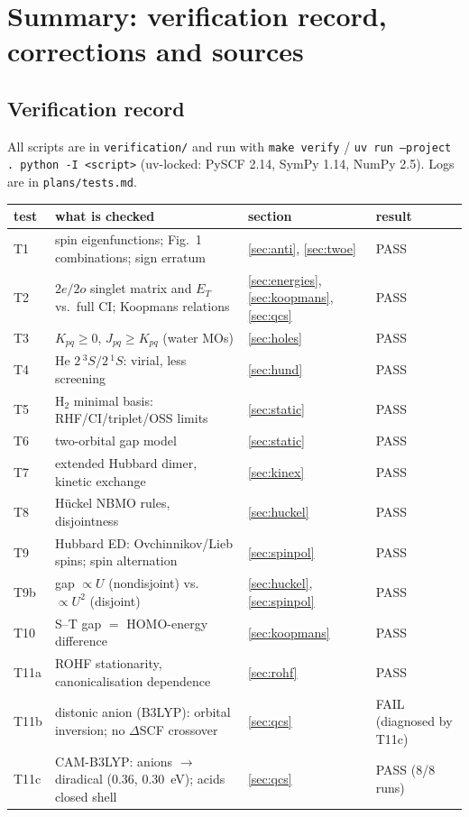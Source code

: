 \section{Summary: verification record, corrections and sources}\label{sec:summary}

\subsection{Verification record}
All scripts are in \texttt{verification/} and run with
\texttt{make verify} / \texttt{uv run --project . python -I <script>} (uv-locked: PySCF 2.14, SymPy 1.14, NumPy 2.5). Logs are in
\texttt{plans/tests.md}.
\begin{center}
\small
\begin{tabular}{llll}
\toprule
test & what is checked & section & result\\
\midrule
T1 & spin eigenfunctions; Fig.~1 combinations; sign erratum & \ref{sec:anti}, \ref{sec:twoe} & PASS\\
T2 & $2e/2o$ singlet matrix and $E_T$ vs.\ full CI; Koopmans relations & \ref{sec:energies}, \ref{sec:koopmans}, \ref{sec:qcs} & PASS\\
T3 & $K_{pq}\ge0$, $J_{pq}\ge K_{pq}$ (water MOs) & \ref{sec:holes} & PASS\\
T4 & He $2\,^3S/2\,^1S$: virial, less screening & \ref{sec:hund} & PASS\\
T5 & H$_2$ minimal basis: RHF/CI/triplet/OSS limits & \ref{sec:static} & PASS\\
T6 & two-orbital gap model & \ref{sec:static} & PASS\\
T7 & extended Hubbard dimer, kinetic exchange & \ref{sec:kinex} & PASS\\
T8 & Hückel NBMO rules, disjointness & \ref{sec:huckel} & PASS\\
T9 & Hubbard ED: Ovchinnikov/Lieb spins; spin alternation & \ref{sec:spinpol} & PASS\\
T9b & gap $\propto U$ (nondisjoint) vs.\ $\propto U^2$ (disjoint) & \ref{sec:huckel}, \ref{sec:spinpol} & PASS\\
T10 & S--T gap $=$ HOMO-energy difference & \ref{sec:koopmans} & PASS\\
T11a & ROHF stationarity, canonicalisation dependence & \ref{sec:rohf} & PASS\\
T11b & distonic anion (B3LYP): orbital inversion; no $\Delta$SCF crossover & \ref{sec:qcs} & FAIL (diagnosed by T11c)\\
T11c & CAM-B3LYP: anions $\to$ diradical (0.36, 0.30~eV); acids closed shell & \ref{sec:qcs} & PASS (8/8 runs)\\

\end{tabular}
\end{center}
